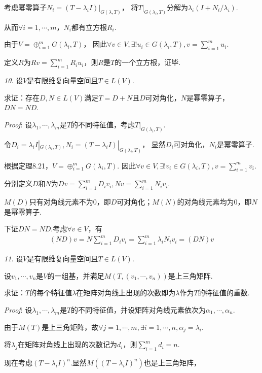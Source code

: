 考虑幂零算子$N_i=(T-\lambda_i I)|_{G(\lambda,T)}$，
将$T|_{G(\lambda_i,T)}$分解为$\lambda_i(I+N_i/\lambda_i)$.

从而$\forall i=1,\cdots,m$，$N_i$都有立方根$R_i$.

由于$V=\oplus_{i=1}^m G(\lambda_i,T)$，
因此$\forall v \in V,\exists! u_i \in G(\lambda_i,T),v=\sum_{i=1}^m u_i$.

定义$R$为$Rv=\sum_{i=1}^m R_iu_i$，则$R$是$T$的一个立方根，证毕.

\newpage

\textit{10.}
设$V$是有限维复向量空间且$T \in L(V)$.

求证：存在$D,N \in L(V)$满足$T=D+N$且$D$可对角化，$N$是幂零算子，$DN=ND$.

\textit{Proof}:
设$\lambda_1,\cdots,\lambda_m$是$T$的不同特征值，考虑$T|_{G(\lambda_i,T)}$.

令$D_i=\lambda_i I|_{G(\lambda_i,T)},N_i=(T-\lambda_i I)|_{G(\lambda_i,T)}$，
显然$D_i$可对角化，$N_i$是幂零算子.

根据定理8.21，$V=\oplus_{i=1}^m G(\lambda_i,T)$.
因此$\forall v \in V,\exists! v_i \in G(\lambda_i,T),v=\sum_{i=1}^m v_i$.

分别定义$D$和$N$为$Dv=\sum_{i=1}^m D_iv_i,Nv=\sum_{i=1}^m N_iv_i$.

$M(D)$只有对角线元素不为$0$，即$D$可对角化；$M(N)$的对角线元素均为$0$，即$N$是幂零算子.

下证$DN=ND$.考虑$\forall v \in V$，有
    \begin{align*}
        (ND)v=N\sum_{i=1}^m D_iv_i=\sum_{i=1}^m \lambda_iN_iv_i=(DN)v
    \end{align*}

\hspace*{\fill}

\textit{11.}
设$V$是有限维复向量空间且$T \in L(V)$.

设$v_1,\cdots,v_n$是$V$的一组基，并满足$M(T,(v_1,\cdots,v_n))$是上三角矩阵.

求证：$T$的每个特征值$\lambda$在矩阵对角线上出现的次数即为$\lambda$作为$T$的特征值的重数.

\textit{Proof}:
设$\lambda_1,\cdots,\lambda_m$是$T$的不同特征值，并设矩阵对角线元素依次为$\alpha_1,\cdots,\alpha_n$.

由于$M(T)$是上三角矩阵，故$\forall j=1,\cdots,m,\exists i=1,\cdots,n,\alpha_j=\lambda_i$.

将$\lambda_j$在矩阵对角线上出现的次数记为$d_i$，则$\sum_{i=1}^m d_i=n$.

现在考虑$(T-\lambda_i I)^n$.显然$M((T-\lambda_i I)^n)$也是上三角矩阵，


